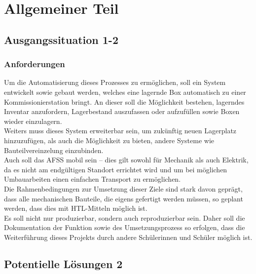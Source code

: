 \section{Allgemeiner Teil}

\subsection{Ausgangssituation 1-2}

\subsubsection{Anforderungen}

Um die Automatisierung dieses Prozesses zu ermöglichen, soll ein System entwickelt sowie gebaut werden, welches eine lagernde Box automatisch zu einer Kommissionierstation bringt. An dieser soll die Möglichkeit bestehen, lagerndes Inventar anzufordern, Lagerbestand auszufassen oder aufzufüllen sowie Boxen wieder einzulagern.\\
Weiters muss dieses System erweiterbar sein, um zukünftig neuen Lagerplatz hinzuzufügen, als auch die Möglichkeit zu bieten, andere Systeme wie Bauteilvereinzelung einzubinden.\\
Auch soll das AFSS mobil sein – dies gilt sowohl für Mechanik als auch Elektrik, da es nicht am endgültigen Standort errichtet wird und um bei möglichen Umbauarbeiten einen einfachen Transport zu ermöglichen.\\
Die Rahmenbedingungen zur Umsetzung dieser Ziele sind stark davon geprägt, dass alle mechanischen Bauteile, die eigens gefertigt werden müssen, so geplant werden, dass dies mit HTL-Mitteln möglich ist.\\
Es soll nicht nur produzierbar, sondern auch reproduzierbar sein. Daher soll die Dokumentation der Funktion sowie des Umsetzungsprozess so erfolgen, dass die Weiterführung dieses Projekts durch andere Schülerinnen und Schüler möglich ist.\\



\subsection{Potentielle Lösungen 2}
